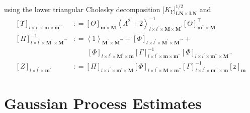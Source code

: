 \documentclass[preprint,12pt]{elsarticle}
\newcommand*{\M}[1]{\ensuremath{#1}\xspace}
\newcommand*{\x}{\times}
\newcommand*{\mi}[1]{\mathbf{#1}}
\newcommand*{\rv}[1]{\mathsf{#1}}
\newcommand*{\te}[2][]{\left\lbrack{#2}\right\rbrack_{#1}}
\newcommand*{\tte}[2][]{\lbrack{#2}\rbrack_{#1}}
\newcommand*{\diag}[2][]{\left\langle{#2}\right\rangle_{#1}}
\newcommand*{\deq}{\M{\mathrel{\mathop:}=}}
\begin{document}
            using the lower triangular Cholesky decomposition $\tte[\mi{LN}\x\mi{LN}]{K_{Y}}^{1/2}$ and
            \begin{equation*}
                \begin{aligned}
                    \te[l\x l^{\prime}\x\mi{m}\x\mi{m^{\prime\prime}}]{\Upsilon} &\deq 
                    \te[\mi{m}\x\mi{M}]{\Theta}
                    \diag[l\x l^{\prime}\x\mi{M}\x\mi{M^{\prime}}]{\Lambda^{2}+2}^{-1} \te[\mi{m^{\prime\prime}}\x\mi{M^{\prime}}]{\Theta}^{\intercal} \\
                    \te[l\x l^{\prime}\x \mi{M^{\prime}}\x\mi{M^{\prime\prime\prime}}]{\Pi}^{-1} &\deq 
                    \diag[\mi{M^{\prime}}\x\mi{M^{\prime\prime\prime}}]{1} + \te[l\x l^{\prime}\x \mi{M^{\prime}}\x\mi{M^{\prime\prime\prime}}]{\Phi} + \\
                    &\phantom{\deq}\ \te[l\x l^{\prime}\x\mi{M^{\prime}\x\mi{m}}]{\Phi}
                    \te[l\x l^{\prime}\x\mi{m}\x\mi{m^{\prime\prime}}]{\Gamma}^{-1} \te[l\x l^{\prime}\x\mi{m^{\prime\prime}}\x\mi{M^{\prime\prime\prime}}]{\Phi} \\
                    \te[l\x l^{\prime}\x \mi{m^{\prime}}]{Z} &\deq 
                    \te[l\x l^{\prime}\x \mi{m^{\prime}}\x\mi{M}]{\Pi}
                    \te[l\x l^{\prime}\x\mi{M}\x\mi{m^{\prime\prime}}]{\Phi}
                    \te[l\x l^{\prime}\x\mi{m^{\prime\prime}}\x\mi{m}]{\Gamma}^{-1}
                    \te[\mi{m}]{\rv{z}}
                \end{aligned}
            \end{equation*}


\section{Gaussian Process Estimates}\label{sec:GPEst}
\end{document}
